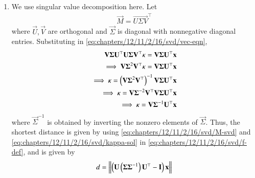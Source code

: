 \begin{enumerate}[label=\thesubsection.\arabic*.,ref=\thesubsection.\theenumi]
	\item    We use singular value decomposition here. Let
    \begin{align}
        \vec{M} = \vec{U\Sigma V}^\top
        \label{eq:chapters/12/11/2/16/svd/M-svd}
    \end{align}
    where $\vec{U}, \vec{V}$ are orthogonal and $\vec{\Sigma}$ is diagonal with
    nonnegative diagonal entries. Substituting in \eqref{eq:chapters/12/11/2/16/svd/vec-eqn},
    \begin{align}
        \mathbf{V\Sigma U}^\top\mathbf{U\Sigma V}^\top\mathbf{\kappa} = \mathbf{V\Sigma U}^\top\mathbf{x} \\
        \implies \mathbf{V\Sigma}^2\mathbf{V}^\top\mathbf{\kappa} = \mathbf{V\Sigma U}^\top\mathbf{x} \\
        \implies \mathbf{\kappa} = \left(\mathbf{V\Sigma}^2\mathbf{V}^\top\right)^{-1}\mathbf{V\Sigma U}^\top\mathbf{x} \\
        \implies \mathbf{\kappa} = \mathbf{V\Sigma}^{-2}\mathbf{V}^\top\mathbf{V\Sigma U}^\top\mathbf{x} \\
        \implies \mathbf{\kappa} = \mathbf{V\Sigma}^{-1}\mathbf{U}^\top\mathbf{x} \label{eq:chapters/12/11/2/16/svd/kappa-sol}
    \end{align}
    where $\vec{\Sigma}^{-1}$ is obtained by inverting the nonzero elements of
    $\vec{\Sigma}$. Thus, the shortest distance is given by using \eqref{eq:chapters/12/11/2/16/svd/M-svd}
    and \eqref{eq:chapters/12/11/2/16/svd/kappa-sol} in \eqref{eq:chapters/12/11/2/16/svd/f-def}, and is given by
    \begin{align}
        d = \left\lVert\left(\mathbf{U}\left(\mathbf{\Sigma\Sigma}^{-1}\right)\mathbf{U}^\top-\mathbf{I}\right)\mathbf{x}\right\rVert
        \label{eq:chapters/12/11/2/16/svd/min-sol}
    \end{align}
\end{enumerate}
